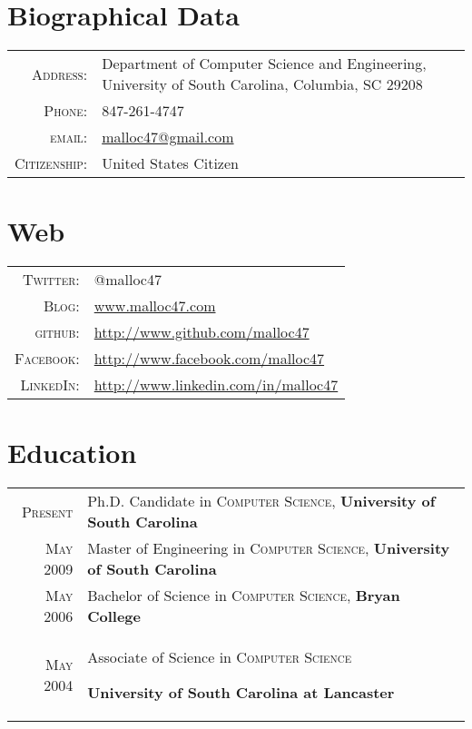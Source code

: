 \documentclass[a4paper,10pt]{article}
\begin{document}
\pagestyle{empty}
\par{\bigskip\par}

\section{Biographical Data}

\begin{tabular}{r p{12cm}}
  \textsc{Address:}	& Department of Computer Science and Engineering, University of South Carolina, Columbia, SC 29208 \\
  \textsc{Phone:}       & 847-261-4747\\
  \textsc{email:}       & \href{mailto:malloc47@gmail.com}{malloc47@gmail.com} \\
  \textsc{Citizenship:} & United States Citizen \\
\end{tabular}

\section{Web}
\begin{tabular}{r p{12cm}}
  \textsc{Twitter:}     & @malloc47 \\
  \textsc{Blog:}	& \href{http://www.malloc47.com}{www.malloc47.com} \\
  \textsc{github:}      & \href{http://www.github.com/malloc47}{http://www.github.com/malloc47}\\
  \textsc{Facebook:}    & \href{http://www.facebook.com/malloc47}{http://www.facebook.com/malloc47} \\
  \textsc{LinkedIn:}       & \href{http://www.linkedin.com/in/malloc47}{http://www.linkedin.com/in/malloc47} \\
\end{tabular}

\section{Education}
\begin{tabular}{r p{12cm}}	
  \textsc{Present} & Ph.D. Candidate in \textsc{Computer Science}, \textbf{University of South Carolina}\\
  \textsc{May} 2009 & Master of Engineering in \textsc{Computer Science}, \textbf{University of South Carolina}\\
  \textsc{May} 2006& Bachelor of Science in \textsc{Computer Science}, \textbf{Bryan College} \\
\textsc{May} 2004& Associate of Science in \textsc{Computer Science} \begin{footnotesize} \textbf{University of South Carolina at Lancaster} \end{footnotesize}
\\
\end{tabular}
\end{document}
